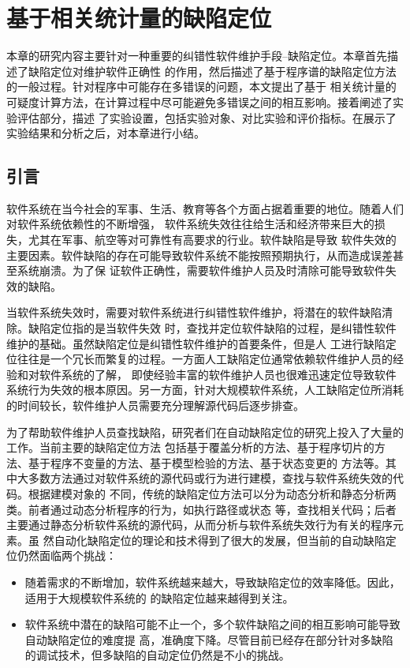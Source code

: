 
\chapter{基于相关统计量的缺陷定位}
本章的研究内容主要针对一种重要的纠错性软件维护手段--缺陷定位。本章首先描述了缺陷定位对维护软件正确性
的作用，然后描述了基于程序谱的缺陷定位方法的一般过程。针对程序中可能存在多错误的问题，本文提出了基于
相关统计量的可疑度计算方法，在计算过程中尽可能避免多错误之间的相互影响。接着阐述了实验评估部分，描述
了实验设置，包括实验对象、对比实验和评价指标。在展示了实验结果和分析之后，对本章进行小结。

\section{引言}
软件系统在当今社会的军事、生活、教育等各个方面占据着重要的地位。随着人们对软件系统依赖性的不断增强，
软件系统失效往往给生活和经济带来巨大的损失，尤其在军事、航空等对可靠性有高要求的行业。软件缺陷是导致
软件失效的主要因素。软件缺陷的存在可能导致软件系统不能按照预期执行，从而造成误差甚至系统崩溃。为了保
证软件正确性，需要软件维护人员及时清除可能导致软件失效的缺陷。

当软件系统失效时，需要对软件系统进行纠错性软件维护，将潜在的软件缺陷清除。缺陷定位指的是当软件失效
时，查找并定位软件缺陷的过程，是纠错性软件维护的基础。虽然缺陷定位是纠错性软件维护的首要条件，但是人
工进行缺陷定位往往是一个冗长而繁复的过程。一方面人工缺陷定位通常依赖软件维护人员的经验和对软件系统的了解，
即使经验丰富的软件维护人员也很难迅速定位导致软件系统行为失效的根本原因。另一方面，针对大规模软件系统，人工缺陷定位所消耗的时间较长，软件维护人员需要充分理解源代码后逐步排查。

为了帮助软件维护人员查找缺陷，研究者们在自动缺陷定位的研究上投入了大量的工作。当前主要的缺陷定位方法
包括基于覆盖分析的方法、基于程序切片的方法、基于程序不变量的方法、基于模型检验的方法、基于状态变更的
方法等。其中大多数方法通过对软件系统的源代码或行为进行建模，查找与软件系统失效的代码。根据建模对象的
不同，传统的缺陷定位方法可以分为动态分析和静态分析两类。前者通过动态分析程序的行为，如执行路径或状态
等，查找相关代码；后者主要通过静态分析软件系统的源代码，从而分析与软件系统失效行为有关的程序元素。虽
然自动化缺陷定位的理论和技术得到了很大的发展，但当前的自动缺陷定位仍然面临两个挑战：

\begin{itemize}
      \item 随着需求的不断增加，软件系统越来越大，导致缺陷定位的效率降低。因此，适用于大规模软件系统的
   的缺陷定位越来越得到关注。
      \item 软件系统中潜在的缺陷可能不止一个，多个软件缺陷之间的相互影响可能导致自动缺陷定位的难度提
      高，准确度下降。尽管目前已经存在部分针对多缺陷的调试技术，但多缺陷的自动定位仍然是不小的挑战。
\end{itemize}

